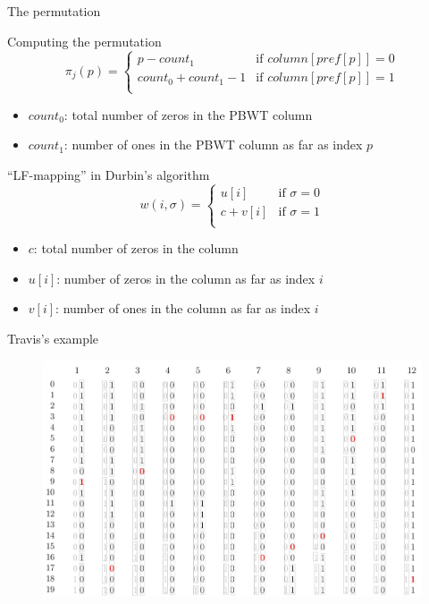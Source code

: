 \documentclass{beamer}
\begin{document}
\begin{frame}{The permutation}
  \begin{block}{Computing the permutation}
    \[\pi_j(p)=
      \begin{cases}
        p-count_1 &\mbox{if } column[pref[p]]=0\\
        count_0+count_1-1 &\mbox{if } column[pref[p]]=1\\
      \end{cases}
    \]
    \begin{itemize}
      \item $count_0$: total number of zeros in the PBWT column
      \item $count_1$: number of ones in the PBWT column as far as index $p$
    \end{itemize}
  \end{block}
  \begin{block}{``LF-mapping'' in Durbin's algorithm}
    \[w(i,\sigma)=
      \begin{cases}
        u[i]&\mbox{if } \sigma=0\\
        c+v[i]&\mbox{if } \sigma=1\\
      \end{cases}
    \]
    \begin{itemize}
      \item $c$: total number of zeros in the column
      \item $u[i]$: number of zeros in the column as far as index $i$
      \item $v[i]$: number of ones in the column as far as index $i$
    \end{itemize}
  \end{block}
\end{frame}
\begin{frame}{Travis's example}
  \begin{figure}[H]
    \centering
    \includegraphics[scale = 0.2]{img/trick.jpg}
  \end{figure}
\end{frame}
\end{document}
